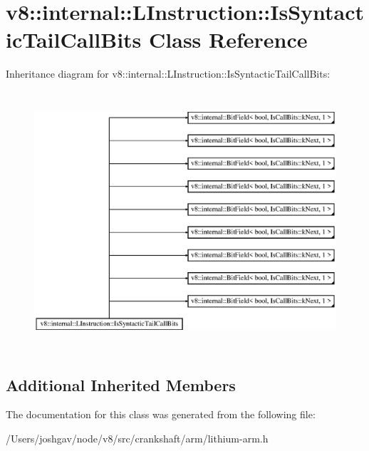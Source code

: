 \hypertarget{classv8_1_1internal_1_1_l_instruction_1_1_is_syntactic_tail_call_bits}{}\section{v8\+:\+:internal\+:\+:L\+Instruction\+:\+:Is\+Syntactic\+Tail\+Call\+Bits Class Reference}
\label{classv8_1_1internal_1_1_l_instruction_1_1_is_syntactic_tail_call_bits}
Inheritance diagram for v8\+:\+:internal\+:\+:L\+Instruction\+:\+:Is\+Syntactic\+Tail\+Call\+Bits\+:\begin{figure}[H]
\begin{center}
\leavevmode
\includegraphics[height=9.621993cm]{classv8_1_1internal_1_1_l_instruction_1_1_is_syntactic_tail_call_bits}
\end{center}
\end{figure}
\subsection*{Additional Inherited Members}


The documentation for this class was generated from the following file\+:\begin{DoxyCompactItemize}
\item 
/\+Users/joshgav/node/v8/src/crankshaft/arm/lithium-\/arm.\+h\end{DoxyCompactItemize}
